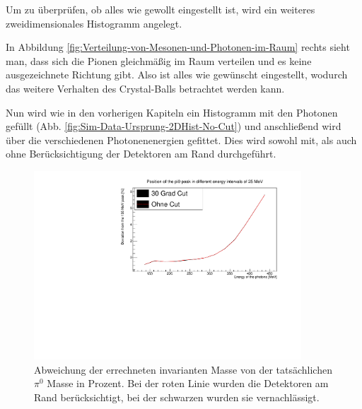 \documentclass[a4paper,11pt,oneside,final,german,openbib,pdftex]{scrbook}
\begin{document}
{%

Um zu überprüfen, ob alles wie gewollt eingestellt ist, wird ein weiteres zweidimensionales Histogramm angelegt.



In Abbildung \ref{fig:Verteilung-von-Mesonen-und-Photonen-im-Raum} rechts sieht man, dass sich die Pionen gleichm\"a{\ss}ig im Raum verteilen und es keine ausgezeichnete Richtung gibt. Also ist alles wie gew\"unscht eingestellt, wodurch das weitere Verhalten des Crystal-Balls betrachtet werden kann.

Nun wird wie in den vorherigen Kapiteln ein Histogramm mit den Photonen gefüllt (Abb. \ref{fig:Sim-Data-Ursprung-2DHist-No-Cut}) und anschließend wird über die verschiedenen Photonenenergien gefittet. Dies wird sowohl mit, als auch ohne Berücksichtigung der Detektoren am Rand durchgeführt.

\begin{figure}[h!]
	\begin{center}
		\includegraphics[width=100mm]{NewCalib/UrsprungIsotrop/20171904SimIsotropUrsprungBothDeviation}
	\end{center}
\caption[Simulation: Symmetrische Photonen; Isotroper Zerfall Abweichung mit und ohne Detektoren am Rand]{Abweichung der errechneten invarianten Masse von der tatsächlichen $\pi^0$ Masse in Prozent. Bei der roten Linie wurden die Detektoren am Rand berücksichtigt, bei der schwarzen wurden sie vernachlässigt.}
\label{fig:Pi0-Ursprung-Relative-Abweichung}
\end{figure}



}
\end{document}
